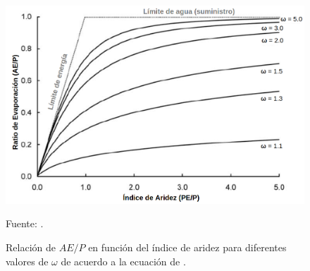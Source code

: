 \begin{figure}[ht!]
	\includegraphics[scale=.42]{Images/budyko01.png}
	\centering
	\caption{Relación de $AE/P$ en función del índice de aridez para diferentes valores de $\omega$ de acuerdo a la ecuación de \citet{Fu1981}.}
	Fuente: \citet{Zhang2004}.
	\label{fig:budyko01}
\end{figure}

 